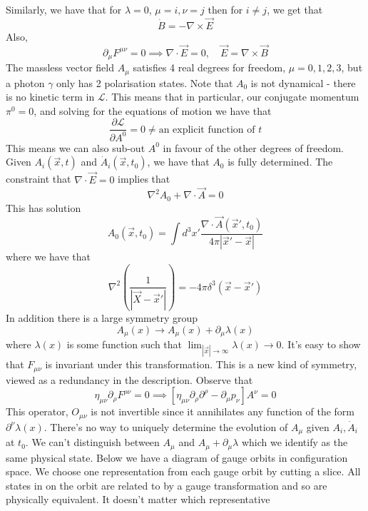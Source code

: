  Similarly, we have that for $ \lambda = 0 $, $\mu = i , \nu  =j $  
 then for $ i \neq j $, we get that
  \[
  \dot{ B } =  - \nabla \times \vec{E} 
 \] Also, 
 \[
  \partial  _ \mu F ^{ \mu \nu }  = 0\implies \nabla \cdot  \vec{E} = 0 , \quad \vec{E} = \nabla \times \vec{B}
 \]
 The massless vector field $A_ \mu  $ satisfies 
 4 real degrees for freedom, $\mu = 0 , 1 , 2 , 3 $, but a photon $ \gamma $ 
 only has 2 polarisation states. 
 Note that $ A _ 0 $ is not dynamical - there is no kinetic term in $ \mathcal{ L }$. This means that in particular, our conjugate momentum $ \pi ^ 0  =0 $,
 and solving for the equations of motion we have that 
 \[
	 \frac{\partial  \mathcal{ L } }{\partial  A^ 0 }    =0  \neq \text{an 
	 explicit function of } t
 \] This means we can also sub-out $ A ^ 0 $ in favour of 
 the other degrees of freedom. 
 Given $A _ i ( \vec{x}, t ) $ and $ \dot{ A } _ i ( \vec{x}, t_0)   $, 
 we have that $A_0 $ is fully determined. 
 The constraint that $\nabla \cdot  \vec{E} = 0 $ implies that 
 \[
  \nabla ^ 2 A _ 0 + \nabla \cdot  \vec{A} = 0 
 \] This has solution 
 \[
	 A_0 ( \vec{x}, t_0 )  = \int d ^ 3 x ' \frac{ \nabla \cdot  \vec{A} ( \vec{x} ' , t_0 )  }{4 \pi | \vec{x} ' - \vec{x} | }
 \] where we have that 
 \[
	 \nabla ^ 2 \left( \frac{1}{| \vec{X} - \vec{x} ' |} \right)  = - 4 \pi \delta ^ 3 ( \vec{x} - \vec{x}' ) 
 \]
 In addition there is a large symmetry group 
 \[
	 A_ \mu ( x ) \to A_ \mu ( x) + \partial  _ \mu \lambda ( x) 
 \] where $ \lambda ( x) $ is some function such that 
 $ \lim _{ | \vec{x} | \to \infty} \lambda ( x ) \to 0 $. 
It's easy to show that $F _{ \mu \nu } $ is invariant under this transformation. 
This is a new kind of symmetry, viewed as a redundancy in the description. 
Observe that 
\[
 \eta_{ \mu \nu } \partial  _\rho F ^{ \rho \nu }  = 0 \implies \left[  
 \eta _{ \mu \nu } \partial  _ \rho \partial  ^ \rho  - \partial  _ \mu p_ \nu  \right]  A^ \nu  =0 
\] This operator, $ O _{ \mu \nu  } $  
is not invertible since it annihilates any function 
of the form $ \partial  ^ \nu \lambda ( x) $. 
There's no way to uniquely determine the evolution of $A_ \mu $ 
given $ A _ i , \dot{ A } _ i  $ at $t_0 $. We can't
distinguish between $A_ \mu $ and $A _ \mu + \partial  _ \mu \lambda $ 
which we identify as the same physical state. 
Below we have a diagram of gauge orbits in configuration space.
We choose one representation from each gauge orbit by cutting
 a slice. All states in on the orbit 
 are related to by a gauge transformation and so are physically equivalent. 
It doesn't matter which representative 
